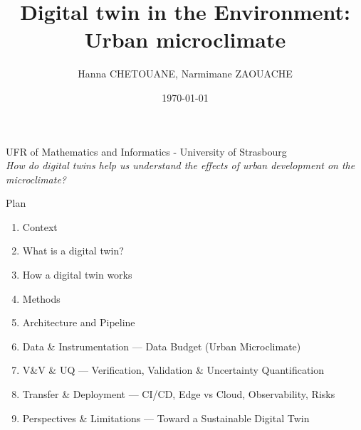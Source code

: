 \documentclass{beamer}
\author[Digital twin in the Environment]{\large Hanna CHETOUANE, Narmimane ZAOUACHE \\ \vspace{-0.8cm} \date{\today}}
\title[Urban mocroclimate]{\textbf{Digital twin in the Environment:} \\ Urban microclimate}
\begin{document}
\begin{frame}
    \titlepage
    \vspace{-0.7cm}
    \begin{center}
        UFR of Mathematics and Informatics - University of Strasbourg 
        \\[0.6cm] 
        \textit{How do digital twins help us understand the effects of urban development on the microclimate?}
    \end{center}
\end{frame} 


\begin{frame}{Plan}
    \begin{enumerate}
        \item Context
        \item What is a digital twin?
        \item How a digital twin works
        \item Methods
        \item Architecture and Pipeline
        \item Data \& Instrumentation — Data Budget (Urban Microclimate)
        \item V\&V \& UQ — Verification, Validation \& Uncertainty Quantification
        \item Transfer \& Deployment — CI/CD, Edge vs Cloud, Observability, Risks
        \item Perspectives \& Limitations — Toward a Sustainable Digital Twin
    \end{enumerate}
\end{frame}
\end{document}
